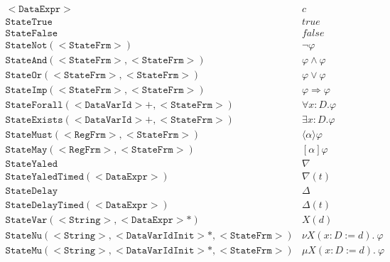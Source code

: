\documentclass[a4paper,10pt]{article}
\begin{document}
\[
\begin{array}{ll}
\mathtt{<DataExpr>                                        } & c                              \\
\mathtt{StateTrue                                         } & true                           \\
\mathtt{StateFalse                                        } & false                          \\
\mathtt{StateNot(<StateFrm>)                              } & \neg \varphi                   \\
\mathtt{StateAnd(<StateFrm>, <StateFrm>)                  } & \varphi \wedge \varphi         \\
\mathtt{StateOr(<StateFrm>, <StateFrm>)                   } & \varphi \vee \varphi           \\
\mathtt{StateImp(<StateFrm>, <StateFrm>)                  } & \varphi \Rightarrow \varphi    \\
\mathtt{StateForall(<DataVarId>+, <StateFrm>)             } & \forall x{:}D .\varphi         \\
\mathtt{StateExists(<DataVarId>+, <StateFrm>)             } & \exists x{:}D .\varphi         \\
\mathtt{StateMust(<RegFrm>, <StateFrm>)                   } & \langle\alpha\rangle \varphi   \\
\mathtt{StateMay(<RegFrm>, <StateFrm>)                    } & [\alpha] \varphi               \\
\mathtt{StateYaled                                        } & \nabla                         \\
\mathtt{StateYaledTimed(<DataExpr>)                       } & \nabla(t)                      \\
\mathtt{StateDelay                                        } & \Delta                         \\
\mathtt{StateDelayTimed(<DataExpr>)                       } & \Delta(t)                      \\
\mathtt{StateVar(<String>, <DataExpr>\ast)                } & X(d)                           \\
\mathtt{StateNu(<String>, <DataVarIdInit>\ast, <StateFrm>)} & \nu  X(x{:}D:=d).~\varphi      \\
\mathtt{StateMu(<String>, <DataVarIdInit>\ast, <StateFrm>)} & \mu  X(x{:}D:=d).~\varphi
\end{array}
\]
\end{document}
